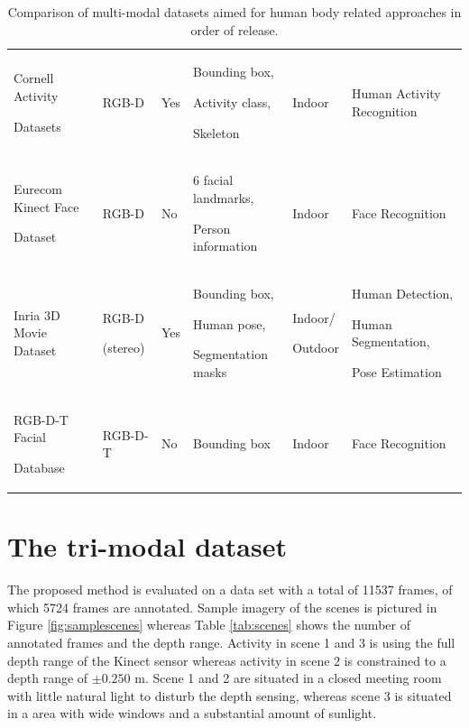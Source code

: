 \documentclass[10pt,twocolumn,letterpaper]{article}
\begin{document}
\begin{table}[htpb]
\begin{tabular}{p{4cm}p{1.5cm}p{0.7cm}p{3cm}p{1.2cm}p{4.1cm}}
Cornell Activity \par Datasets \cite{koppula2013learning}\strut	&	RGB-D	&	Yes	&	Bounding box, \par Activity class,\strut \par Skeleton\strut	&	Indoor	&	Human Activity Recognition \\
Eurecom Kinect Face \par Dataset \cite{huynh2013efficient}\strut	&	RGB-D	&	No	&	6 facial landmarks, \par Person information\strut	&	Indoor	&	Face Recognition \\
Inria 3D Movie Dataset \cite{alahari2013pose}	&	RGB-D \par(stereo)\strut 	&	Yes	&	Bounding box, \par Human pose,\strut \par Segmentation masks\strut	&	Indoor/ \par Outdoor\strut	&	Human Detection, \par Human Segmentation,\strut \par Pose Estimation\strut \\
RGB-D-T Facial \par Database \cite{nikisinsrgb}\strut &	RGB-D-T	&	No	&	Bounding box	&	Indoor	&	Face Recognition \\
\hline
\end{tabular}
\caption{Comparison of multi-modal datasets aimed for human body related approaches in order of release.}
\label{tab:datasets}
\end{table}
 
\section{The tri-modal dataset}
\label{sec:dataset}

The proposed method is evaluated on a data set with a total of 11537 frames, of which 5724 frames are annotated. Sample imagery of the scenes is pictured in Figure \ref{fig:samplescenes} whereas Table \ref{tab:scenes} shows the number of annotated frames and the depth range. Activity in scene 1 and 3 is using the full depth range of the Kinect sensor whereas activity in scene 2 is constrained to a depth range of $\pm 0.250$ m. Scene 1 and 2 are situated in a closed meeting room with little natural light to disturb the depth sensing, whereas scene 3 is situated in a area with wide windows and a substantial amount of sunlight.
\end{document}
